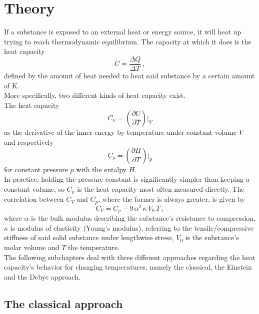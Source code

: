 \section{Theory}
\label{sec:theorie}

If a substance is exposed to an external heat or energy source,
it will heat up trying to reach thermodynamic equilibrium.
The capacity at which it does is the heat capacity
\begin{equation*}
    C = \frac{\Delta Q}{\Delta T} \,,
\end{equation*}
defined by the amount of heat needed to heat said substance by a certain amount of
$\si{\kelvin}$. \\

More specifically, two different kinds of heat capacity exist. \\
The heat capacity 
\begin{equation*}
    C_{V} = \left( \frac{\partial U}{\partial T} \right) \big \vert _V
\end{equation*}
as the derivative of the inner energy by temperature under constant volume $V$ and respectively
\begin{equation*}
    C_{p} = \left( \frac{\partial H}{\partial T} \right) \big \vert _p
\end{equation*}
for constant pressure $p$ with the entalpy $H$. \\

In practice, holding the pressure constant is significantly simpler than keeping a constant volume, so $C_p$ is the heat capacity most often measured directly.
The correlation between $C_V$ and $C_p$, where the former is always greater, is given by
\begin{equation}
    C_V = C_p - 9 \, \alpha^2 \, \kappa \, V_0 \, T \,,
\end{equation}
where $\alpha$ is the bulk modulus describing the substance's resistance to compression, $\kappa$ is modulus of elasticity (Young's modulus), referring to the tensile/compressive stiffness of said solid substance
under lengthwise stress, $V_0$ is the substance's molar volume and $T$ the temperature. \\

The following subchapters deal with three different approaches regarding the heat capacity's behavior for changing temperatures, namely the classical, the Einstein and the Debye approach.

\subsection{The classical approach}

